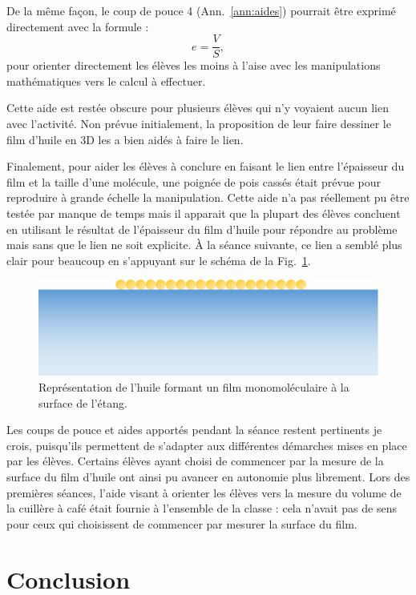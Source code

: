 \documentclass[12pt,a4paper, fleqn]{article}
\begin{document}
De la même façon, le coup de pouce 4 (Ann.~\ref{ann:aides}) pourrait être exprimé directement avec la formule :
\[e = \frac{V}{S}, \]
pour orienter directement les élèves les moins à l'aise avec les manipulations mathématiques vers le calcul à effectuer.

Cette aide est restée obscure pour plusieurs élèves qui n'y voyaient aucun lien avec l'activité.
Non prévue initialement, la proposition de leur faire dessiner le film d'huile en 3D les a bien aidés à faire le lien.

Finalement, pour aider les élèves à conclure en faisant le lien entre l'épaisseur du film et la taille d'une molécule, une poignée de pois cassés était prévue pour reproduire à grande échelle la manipulation.
Cette aide n'a pas réellement pu être testée par manque de temps mais il apparait que la plupart des élèves concluent en utilisant le résultat de l'épaisseur du film d'huile pour répondre au problème mais sans que le lien ne soit explicite.
À la séance suivante, ce lien a semblé plus clair pour beaucoup en s'appuyant sur le schéma de la Fig.~\ref{fig:exp}.

\begin{figure}
\center
\includegraphics[scale=.25]{experience.png}
\caption{Représentation de l'huile formant un film monomoléculaire à la surface de l'étang.}
\label{fig:exp}
\end{figure}

Les coups de pouce et aides apportés pendant la séance restent pertinents je crois, puisqu'ils permettent de s'adapter aux différentes démarches mises en place par les élèves.
Certains élèves ayant choisi de commencer par la mesure de la surface du film d'huile ont ainsi pu avancer en autonomie plus librement.
Lors des premières séances, l'aide visant à orienter les élèves vers la mesure du volume de la cuillère à café était fournie à l'ensemble de la classe : cela n'avait pas de sens pour ceux qui choisissent de commencer par mesurer la surface du film.

\section*{Conclusion}
\end{document}

